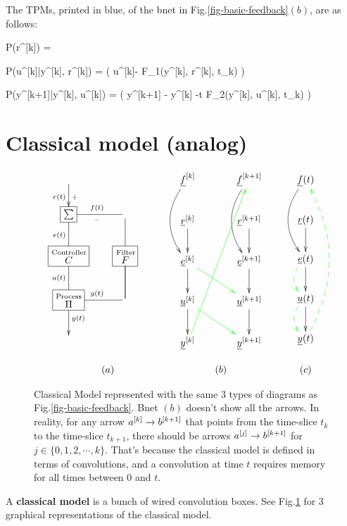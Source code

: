 The TPMs, 
printed in blue,
of the bnet
in Fig.\ref{fig-basic-feedback}$(b)$,
are as follows:

\beq \color{blue}
P(r^{[k]}) = 
\eeq

\beq\color{blue}
P(u^{[k]}|y^{[k]}, r^{[k]}) = 
\delta(\quad
u^{[k]}- F_1(y^{[k]}, r^{[k]}, t_k)
\quad)
\eeq


\beq\color{blue}
P(y^{[k+1]}|y^{[k]}, u^{[k]})
=
\delta(\quad
y^{[k+1]}
- y^{[k]} -\Delta t F_2(y^{[k]}, u^{[k]}, t_k)
\quad)
\eeq




\section{Classical model (analog)}


\begin{figure}[h!]
$$
\begin{array}{ccc}
\xymatrix{
\ar[d]_{r(t)}^{+}
\\
*+[F]{\sum}
\ar@{-}[d]_{e(t)}
&\ar@{-}[l]^{-}_{f(t)}
\\
*+[F]{\stackrel{\rm Controller}{C}}
\ar@{-}[d]_{u(t)}
&
*+[F]{\stackrel{\rm Filter} {F}}
\ar@{-}[u]\ar@{-}[d]
&
\\
*+[F]{\stackrel{\rm Process} {\Pi}}
\ar@{-}[r]^{y(t)}
\ar[d]^{y(t)}
&\ar@{-}[u]
\\
&
}
&
\xymatrix@C=3pc{
\rvf^{[k]}\ar@/_1.5pc/[dd]
&
\rvf^{[k+1]}\ar@/_1.5pc/[dd]
\\
\rvr^{[k]}\ar[d]
&
\rvr^{[k+1]}\ar[d]
\\
\rve^{[k]}\ar[d]\ar@[green][rd]
&
\rve^{[k+1]}\ar[d]
\\
\rvu^{[k]}\ar[d]\ar@[green][rd]
&\rvu^{[k+1]}\ar[d]
\\
\rvy^{[k]}\ar@[green][ruuuu]
&
\rvy^{[k+1]}
}
&\quad\quad
\xymatrix{
\rvf(t)\ar@/_1.5pc/[dd]
\\
\rvr(t)\ar[d]
\\
\rve(t)\ar[d]\ar@[green]@{-->}@/_1pc/[d]
\\
\rvu(t)\ar[d]\ar@[green]@{-->}@/_1pc/[d]
\\
\rvy(t)\ar@[green]@{-->}@/_2pc/[uuuu]
}
\\
\\
(a)& (b) &\quad\quad (c)
\end{array}
$$
\caption{
Classical Model
represented
with
the same 3
types of diagrams
as Fig.\ref{fig-basic-feedback}.
Bnet $(b)$
doesn't
show all the arrows.
In reality,
for any arrow $a^{[k]}\rightarrow b^{[k+1]}$ that
points from the 
time-slice $t_k$
to the time-slice $t_{k+1}$,
there should 
be arrows 
$a^{[j]}\rightarrow b^{[k+1]}$
for $j\in\{0,1,2, \cdots, k
\}$.
That's because
the classical model is defined
in terms of convolutions,
and a convolution
at time $t$ requires
memory for all times
between 0 and $t$.
}
\label{fig-classic-model}
\end{figure}
A {\bf classical
model} is a bunch of
 wired convolution boxes.
 See Fig.\ref{fig-classic-model}
 for 3
 graphical
 representations of
 the classical model.
 
